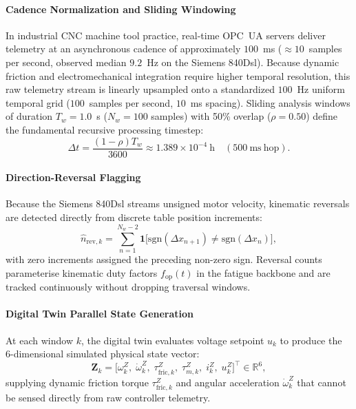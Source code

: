 \documentclass[a4paper,fleqn]{cas-dc}
\newcommand{\R}{\mathbb{R}}
\begin{document}
\paragraph{Cadence Normalization and Sliding Windowing}
In industrial CNC machine tool practice, real-time OPC~UA servers deliver telemetry at an asynchronous cadence of approximately $100$~ms ($\approx 10$~samples per second, observed median $9.2$~Hz on the Siemens 840Dsl). Because dynamic friction and electromechanical integration require higher temporal resolution, this raw telemetry stream is linearly upsampled onto a standardized $100$~Hz uniform temporal grid ($100$~samples per second, $10$~ms spacing). Sliding analysis windows of duration $T_w = 1.0$~s ($N_w = 100$ samples) with 50\% overlap ($\rho = 0.50$) define the fundamental recursive processing timestep:
\begin{equation}
    \Delta t = \frac{(1 - \rho) T_w}{3600} \approx 1.389 \times 10^{-4}~\mathrm{h} \quad (500~\mathrm{ms~hop}).
    \label{eq:dt_step}
\end{equation}

\paragraph{Direction-Reversal Flagging}
Because the Siemens 840Dsl streams unsigned motor velocity, kinematic reversals are detected directly from discrete table position increments:
\begin{equation}
    \hat{n}_{\mathrm{rev},k} = \sum_{n=1}^{N_w-2} \mathbf{1}\bigl[\mathrm{sgn}(\Delta x_{n+1}) \ne \mathrm{sgn}(\Delta x_n)\bigr],
    \label{eq:reversal_flag}
\end{equation}
with zero increments assigned the preceding non-zero sign. Reversal counts parameterise kinematic duty factors $f_{\mathrm{op}}(t)$ in the fatigue backbone and are tracked continuously without dropping traversal windows.

\paragraph{Digital Twin Parallel State Generation}
At each window $k$, the digital twin evaluates voltage setpoint $u_k$ to produce the 6-dimensional simulated physical state vector:
\begin{equation}
    \mathbf{Z}_k = \bigl[\omega_k^Z, \; \dot{\omega}_k^Z, \; \tau_{\mathrm{fric},k}^Z, \; \tau_{m,k}^Z, \; i_k^Z, \; u_k^Z\bigr]^\top \in \R^6,
    \label{eq:dt_state_vec}
\end{equation}
supplying dynamic friction torque $\tau_{\mathrm{fric},k}^Z$ and angular acceleration $\dot{\omega}_k^Z$ that cannot be sensed directly from raw controller telemetry.
\end{document}
